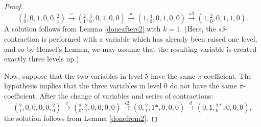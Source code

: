 \documentclass[draft]{publmathdeb}
\begin{document}
\begin{proof}
$$({}^{3}_{0},0,1,0,0,{}^{2}_{1}) \xrightarrow{c} ({}^{2}_{1},{}^{3}_{0},0,1,0,0) \xrightarrow{d} (1,{}^{4}_{0},0,1,0,0) \xrightarrow{s3}(1,{}^{2}_{0},0,1,1,0).$$
A solution follows from Lemma \ref{doneafters2} with $k=1$.  (Here, the \textit{s3}-contraction is performed with a variable which has already been raised one level, and so by Hensel's Lemma, we may assume that the resulting variable is created exactly three levels up.)

Now, suppose that the two variables in level 5 have the same $\pi$-coefficient.
The hypothesis implies that the three variables in level 0 do not have the same $\pi$-coefficient.  After the change of variables and series of contractions:
$$({}^{2}_{1},0,0,0,0,{}^{2}_{0}) \xrightarrow{c} ({}^{2}_{0},{}^{2}_{1},0,0,0,0) \xrightarrow{s2} (0,{}^{2}_{1},1*,0,0,0) \xrightarrow{d} (0,1,{}^{2*}_{0},0,0,0),$$
the solution follows from Lemma \ref{donefrom2}.

\end{proof}
\end{document}
